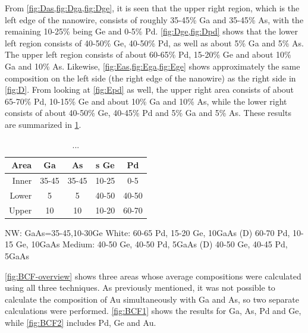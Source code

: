 From \cref{fig:Das,fig:Dga,fig:Dge}, it is seen that the upper right region, which is the left edge of the nanowire, consists of roughly 35-45\% Ga and 35-45\% As, with the remaining 10-25\% being Ge and 0-5\% Pd. \cref{fig:Dge,fig:Dpd} shows that the lower left region consists of 40-50\% Ge, 40-50\% Pd, as well as about 5\% Ga and 5\% As. The upper left region consists of about 60-65\% Pd, 15-20\% Ge and about 10\% Ga and 10\% As. Likewise, \cref{fig:Eas,fig:Ega,fig:Ege} shows approximately the same composition on the left side (the right edge of the nanowire) as the right side in \cref{fig:D}. From looking at \cref{fig:Epd} as well, the upper right area consists of about 65-70\% Pd, 10-15\% Ge and about 10\% Ga and 10\% As, while the lower right consists of about 40-50\% Ge, 40-45\% Pd and 5\% Ga and 5\% As. These results are summarized in \cref{tab:D-E-composition}.

\begin{table}
	\caption{...}
	\begin{center}
		\begin{tabular}{r|cccc}			
			Area & Ga & As &s Ge & Pd \\ 
			\midrule
			\hline
			Inner & 35-45 & 35-45 & 10-25 & 0-5\\
			Lower & 5 & 5 & 40-50 & 40-50\\
			Upper & 10 & 10 & 10-20 & 60-70\\
			\hline
		\end{tabular} 
	\end{center}
	\label{tab:D-E-composition}
\end{table}

NW: GaAs=35-45,10-30Ge
White: 60-65 Pd, 15-20 Ge, 10GaAs (D) 60-70 Pd, 10-15 Ge, 10GaAs
Medium: 40-50 Ge, 40-50 Pd, 5GaAs (D) 40-50 Ge, 40-45 Pd, 5GaAs

\cref{fig:BCF-overview} shows three areas whose average compositions were calculated using all three techniques. As previously mentioned, it was not possible to calculate the composition of Au simultaneously with Ga and As, so two separate calculations were performed. \cref{fig:BCF1} shows the results for Ga, As, Pd and Ge, while \cref{fig:BCF2} includes Pd, Ge and Au. 

